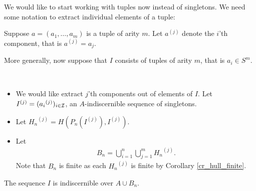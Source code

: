 \newcommand{\tpl}[2]{{#1}^{(#2)}}

We would like to start working with tuples now instead of singletons.
We need some notation to extract individual elements of a tuple:
\begin{Definition}
  Suppose $a = (a_1, \ldots, a_m)$ is a tuple of arity $m$.
  Let $\tpl{a}{j}$ denote the $i$'th component, that is $\tpl{a}{j} = a_j$.
\end{Definition}

More generally, now suppose that $I$ consists of tuples of arity $m$, that is $a_i \in S^m$.

\begin{Definition} \ 
  \begin{itemize}
  \item We would like extract $j$'th components out of elements of $I$.
    Let $\tpl{I}{j} = (\tpl{a_i}{j})_{i \in \I}$, an $A$-indiscernible sequence of singletons.
  \item Let $\tpl{H_n}{j} = H(P_n(\tpl{I}{j}), \tpl{I}{j})$.
  \item Let
    \begin{align*}
      B_n = \bigcup_{i = 1}^{n} \bigcup_{j = 1}^{m} \tpl{H_n}{j}.
    \end{align*}
    Note that $B_n$ is finite as each $\tpl{H_n}{j}$ is finite by Corollary \ref{cr_hull_finite}.
  \end{itemize}
\end{Definition}

\begin{Lemma} \label{cr_bump}
  The sequence $I$ is indiscernible over $A \cup B_n$.
\end{Lemma}

